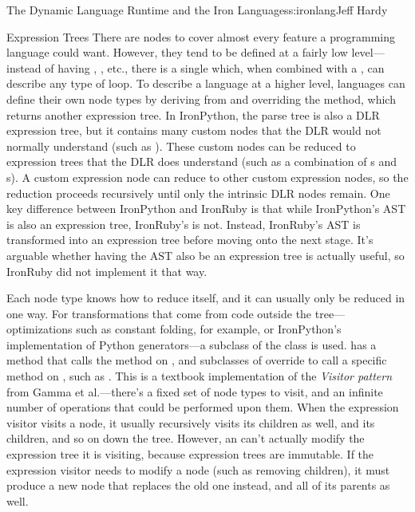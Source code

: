 \begin{aosachapter}{The Dynamic Language Runtime and the Iron Languages}{s:ironlang}{Jeff Hardy}
\begin{aosasect1}{Expression Trees}
There are nodes to cover almost every feature a programming language could
want. However, they tend to be defined at a fairly low level---instead of
having , , etc., there is a single
 which, when combined with a , can
describe any type of loop. To describe a language at a higher level, languages
can define their own node types by deriving from  and
overriding the  method, which returns another expression tree.
In IronPython, the parse tree is also a DLR expression tree, but it contains
many custom nodes that the DLR would not normally understand (such as
). These custom nodes can be reduced to expression trees
that the DLR does understand (such as a combination of s
and s). A custom expression node can reduce to other
custom expression nodes, so the reduction proceeds recursively until only the
intrinsic DLR nodes remain. One key difference between IronPython and IronRuby
is that while IronPython's AST is also an expression tree, IronRuby's is not.
Instead, IronRuby's AST is transformed into an expression tree before moving
onto the next stage. It's arguable whether having the AST also be an expression
tree is actually useful, so IronRuby did not implement it that way.

Each node type knows how to reduce itself, and it can usually only be reduced
in one way. For transformations that come from code outside the 
tree---optimizations such as constant folding, for example, or IronPython's
implementation of Python generators---a subclass of the
 class is used.  has a
 method that calls the  method on
, and subclasses of  override 
to call a specific  method on , such as
. This is a textbook implementation of the \emph{Visitor
pattern} from Gamma et al.---there's a fixed set of node types to visit, and an
infinite number of operations that could be performed upon them. When the
expression visitor visits a node, it usually recursively visits its children as
well, and its children, and so on down the tree. However, an
 can't actually modify the expression tree it is
visiting, because expression trees are immutable. If the expression visitor
needs to modify a node (such as removing children), it must produce a new node
that replaces the old one instead, and all of its parents as well.


\end{aosasect1}
\end{aosachapter}
